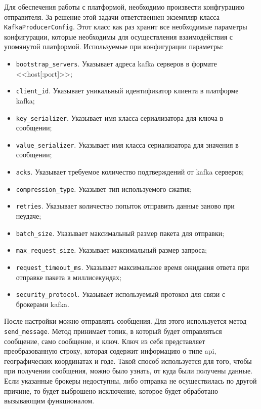 Для обеспечения работы с платформой, необходимо произвести конфгурацию отправителя.
За решение этой задачи ответственнен экземпляр класса \texttt{KafkaProducerConfig}.
Этот класс как раз хранит все необходимые параметры конфигурации, которые необходимы для осуществления взаимодействия с упомянутой платформой.
Используемые при конфигурации параметры:
\begin{itemize}
    \item \texttt{bootstrap\_servers}. Указывает адреса kafka серверов в формате <<host[:port]>>;
    \item \texttt{client\_id}. Указывает уникальный идентификатор клиента в платформе kafka;
    \item \texttt{key\_serializer}. Указывает имя класса сериализатора для ключа в сообщении;
    \item \texttt{value\_serializer}. Указывает имя класса сериализатора для значения в сообщении;
    \item \texttt{acks}. Указывает требуемое количество подтверждений от kafka серверов;
    \item \texttt{compression\_type}. Указывет тип используемого сжатия;
    \item \texttt{retries}. Указывает количество попыток отправить данные заново при неудаче;
    \item \texttt{batch\_size}. Указывает максимальный размер пакета для отправки;
    \item \texttt{max\_request\_size}. Указывает максимальный размер запроса;
    \item \texttt{request\_timeout\_ms}. Указывает максимальное время ожидания ответа при отправке пакета в миллисекундах;
    \item \texttt{security\_protocol}. Указывает используемый протокол для связи с брокерами kafka.
\end{itemize}

После настройки можно отправлять сообщения.
Для этого используется метод \texttt{send\_message}.
Метод принимает топик, в который будет отправляться сообщение, само сообщение, и ключ.
Ключ из себя представляет преобразованную строку, которая содержит информацию о типе api, географических координатах и годе.
Такой способ используется для того, чтобы при получении сообщения, можно было узнать, от куда были получены данные.
Если указанные брокеры недоступны, либо отправка не осуществилась по другой причине, то будет выброшено исключение, которое будет обработано вызывающим функционалом.






